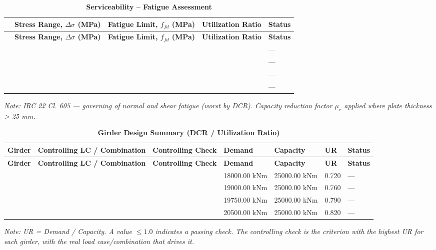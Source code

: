 \documentclass[12pt,a4paper]{report}
\numberwithin{table}{chapter}
\numberwithin{figure}{chapter}
\begin{document}
\vspace{1em}
\begin{longtable}{|C{2.5cm}|C{3.5cm}|C{3.5cm}|>{\centering\arraybackslash}p{3.5cm}|C{2.5cm}|}
\caption{\textbf{Serviceability -- Fatigue Assessment}}
\hline
{} \textbf{} & \textbf{Stress Range, $\Delta\sigma$ (MPa)} & \textbf{Fatigue Limit, $f_{fd}$ (MPa)} & \textbf{Utilization Ratio} & \textbf{Status} \\[6pt]
\hline
\endfirsthead
\hline
{} \textbf{} & \textbf{Stress Range, $\Delta\sigma$ (MPa)} & \textbf{Fatigue Limit, $f_{fd}$ (MPa)} & \textbf{Utilization Ratio} & \textbf{Status} \\[6pt]
\hline
\endhead
\makecell{} &  &  &  & --- \\[6pt]
\hline
\makecell{} &  &  &  & --- \\[6pt]
\hline
\makecell{} &  &  &  & --- \\[6pt]
\hline
\makecell{} &  &  &  & --- \\[6pt]
\hline
\end{longtable}
\noindent\textit{Note: IRC 22 Cl. 605 --- governing of normal and shear fatigue (worst by DCR). Capacity reduction factor $\mu_r$ applied where plate thickness > 25 mm.}

\vspace{1em}
\vspace{0.4em}
\begin{longtable}{|C{1.6cm}|>{\centering\arraybackslash}p{3.6cm}|C{2.4cm}|C{2.0cm}|C{2.1cm}|C{1.7cm}|C{1.5cm}|}
\caption{\textbf{Girder Design Summary (DCR / Utilization Ratio)}}
\hline
{} \textbf{Girder} & \textbf{Controlling LC / Combination} & \textbf{Controlling Check} & \textbf{Demand} & \textbf{Capacity} & \textbf{UR} & \textbf{Status} \\[6pt]
\hline
\endfirsthead
\hline
{} \textbf{Girder} & \textbf{Controlling LC / Combination} & \textbf{Controlling Check} & \textbf{Demand} & \textbf{Capacity} & \textbf{UR} & \textbf{Status} \\[6pt]
\hline
\endhead
 &  &  & 18000.00 kNm & 25000.00 kNm & 0.720 & --- \\[6pt]
\hline
 &  &  & 19000.00 kNm & 25000.00 kNm & 0.760 & --- \\[6pt]
\hline
 &  &  & 19750.00 kNm & 25000.00 kNm & 0.790 & --- \\[6pt]
\hline
 &  &  & 20500.00 kNm & 25000.00 kNm & 0.820 & --- \\[6pt]
\hline
\end{longtable}
\noindent\textit{Note: UR = Demand / Capacity. A value $\leq 1.0$ indicates a passing check. The controlling check is the criterion with the highest UR for each girder, with the real load case/combination that drives it.}
\end{document}
